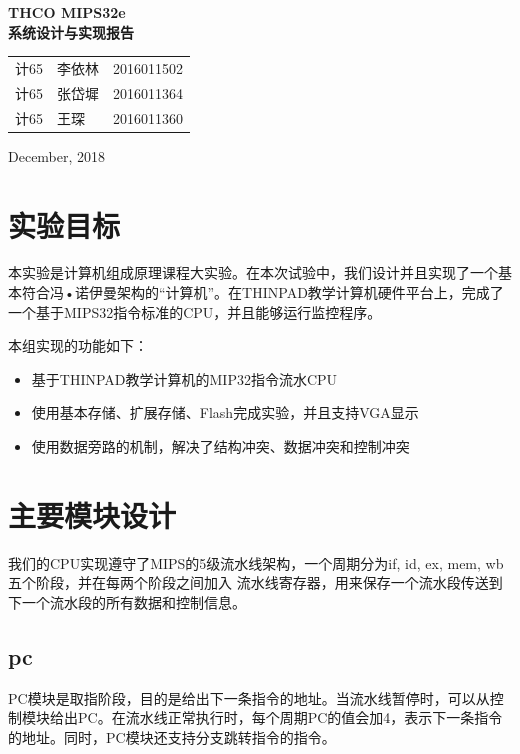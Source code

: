 \documentclass[12pt, utf8, hyperref]{ctexart}
\begin{document}
\begin{titlepage}
\centering
{}

\Huge{\textbf{THCO MIPS32e \\ 系统设计与实现报告}}


\begin{table}[h]
\centering
\Large
\begin{tabular}{lll}
计65 & 李依林 & 2016011502 \\
计65 & 张岱墀 & 2016011364 \\
计65 & 王琛 & 2016011360
\end{tabular}
\end{table}

\normalsize December, 2018
\end{titlepage}


\cleardoublepage

\tableofcontents

\newpage
\section{实验目标}
本实验是计算机组成原理课程大实验。在本次试验中，我们设计并且实现了一个基本符合冯•诺伊曼架构的“计算机”。在THINPAD教学计算机硬件平台上，完成了一个基于MIPS32指令标准的CPU，并且能够运行监控程序。

本组实现的功能如下：
\begin{itemize}
    \item 基于THINPAD教学计算机的MIP32指令流水CPU
    \item 使用基本存储、扩展存储、Flash完成实验，并且支持VGA显示
    \item 使用数据旁路的机制，解决了结构冲突、数据冲突和控制冲突
\end{itemize}

\section{主要模块设计}
我们的CPU实现遵守了MIPS的5级流水线架构，一个周期分为if, id, ex, mem, wb五个阶段，并在每两个阶段之间加入 流水线寄存器，用来保存一个流水段传送到下一个流水段的所有数据和控制信息。
\subsection{pc}
PC模块是取指阶段，目的是给出下一条指令的地址。当流水线暂停时，可以从控制模块给出PC。在流水线正常执行时，每个周期PC的值会加4，表示下一条指令的地址。同时，PC模块还支持分支跳转指令的指令。
\end{document}
